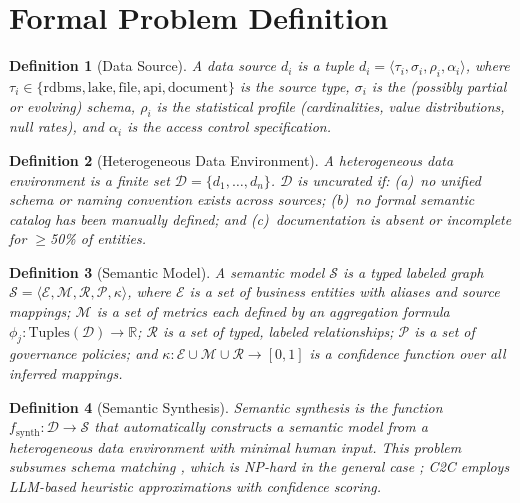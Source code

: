 \documentclass[11pt,a4paper]{article}
\newtheorem{definition}{Definition}
\newcommand{\C}[1]{\mathcal{#1}}
\begin{document}
\section{Formal Problem Definition}\label{sec:formalism}

\begin{definition}[Data Source]\label{def:source}
A \emph{data source} $d_i$ is a tuple $d_i = \langle \tau_i, \sigma_i, \rho_i,
\alpha_i \rangle$, where $\tau_i \in \{\text{rdbms}, \text{lake}, \text{file},
\text{api}, \text{document}\}$ is the source type, $\sigma_i$ is the
(possibly partial or evolving) schema, $\rho_i$ is the statistical profile
(cardinalities, value distributions, null rates), and $\alpha_i$ is the access
control specification.
\end{definition}

\begin{definition}[Heterogeneous Data Environment]\label{def:hde}
A \emph{heterogeneous data environment} is a finite set $\C{D} = \{d_1,\ldots,d_n\}$.
$\C{D}$ is \emph{uncurated} if: (a)~no unified schema or naming convention exists
across sources; (b)~no formal semantic catalog has been manually defined; and
(c)~documentation is absent or incomplete for $\geq$50\% of entities.
\end{definition}

\begin{definition}[Semantic Model]\label{def:sm}
A \emph{semantic model} $\C{S}$ is a typed labeled graph $\C{S} = \langle
\C{E}, \C{M}, \C{R}, \C{P}, \kappa \rangle$, where $\C{E}$ is a set of
\emph{business entities} with aliases and source mappings; $\C{M}$ is a set of
\emph{metrics} each defined by an aggregation formula $\phi_j :
\mathrm{Tuples}(\C{D}) \to \mathbb{R}$; $\C{R}$ is a set of typed, labeled
relationships; $\C{P}$ is a set of \emph{governance policies}; and $\kappa :
\C{E} \cup \C{M} \cup \C{R} \to [0,1]$ is a \emph{confidence function} over all
inferred mappings.
\end{definition}

\begin{definition}[Semantic Synthesis]
\emph{Semantic synthesis} is the function $f_\mathrm{synth} : \C{D} \to \C{S}$
that automatically constructs a semantic model from a heterogeneous data
environment with minimal human input.  This problem subsumes schema matching
\citep{gungor2025schemora}, which is NP-hard in the general case
\citep{rahm2001schema}; C2C employs LLM-based heuristic approximations with
confidence scoring.
\end{definition}
\end{document}
